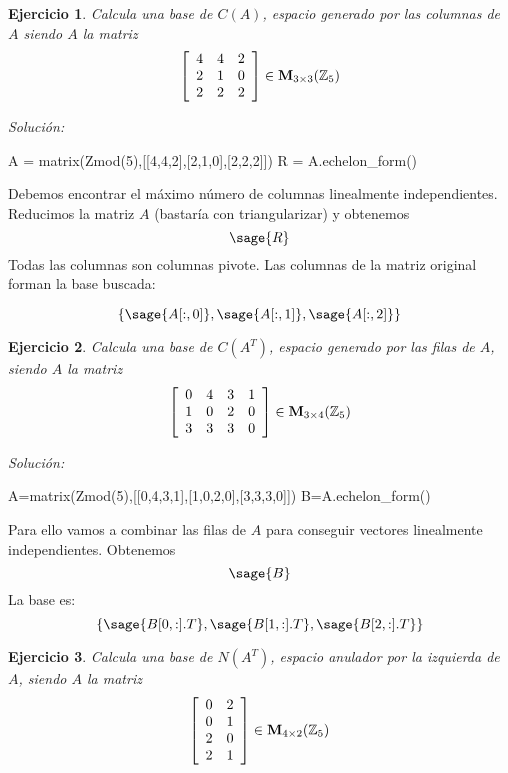 \documentclass{amsart}
\newtheorem{ejer}{Ejercicio}
\begin{document}

\begin{ejer} Calcula una base de $C(A)$, espacio generado por las columnas de $A$ siendo $A$ la matriz
\[ \left[\begin{array}{rrr}
4 & 4 & 2 \\
2 & 1 & 0 \\
2 & 2 & 2 
\end{array}\right] \in {\bf M}_{3 \times 3}({\mathbb Z}_{5})\]
\end{ejer}

{\it Soluci\'on:}
\begin{sageblock}
A = matrix(Zmod(5),[[4,4,2],[2,1,0],[2,2,2]])
R = A.echelon_form()
\end{sageblock}
Debemos encontrar el máximo número de columnas linealmente independientes. 
Reducimos la matriz $A$ (bastaría con triangularizar) y obtenemos
\[ \sage{R} \] Todas las columnas son columnas pivote. Las columnas de la 
matriz original forman la base buscada:

\[ \left\lbrace \sage{A[:,0]}, \sage{A[:,1]}, \sage{A[:,2]}  \right\rbrace \]




\begin{ejer} Calcula una base de $C(A^T)$, espacio generado por las filas de $A$, siendo $A$ la matriz
\[ \left[\begin{array}{rrrr}
0 & 4 & 3 & 1 \\
1 & 0 & 2 & 0 \\
3 & 3 & 3 & 0 
\end{array}\right] \in {\bf M}_{3 \times 4}({\mathbb Z}_{5})\]
\end{ejer}

{\it Soluci\'on:}
\begin{sageblock}
A=matrix(Zmod(5),[[0,4,3,1],[1,0,2,0],[3,3,3,0]])
B=A.echelon_form()
\end{sageblock}
Para ello vamos a combinar las filas de $A$ para conseguir vectores 
linealmente independientes. Obtenemos
\[ \sage{B} \] La base es:
\[ \left\lbrace \sage{B[0,:].T}, \sage{B[1,:].T}, \sage{B[2,:].T} \right\rbrace \] 


\begin{ejer} Calcula una base de $N(A^T)$, espacio anulador por la izquierda de 
$A$, siendo $A$ la matriz
\[ \left[\begin{array}{rr}
0 & 2 \\
0 & 1 \\
2 & 0 \\ 
2 & 1 
\end{array}\right] \in {\bf M}_{4 \times 2}({\mathbb Z}_{5})\]
\end{ejer}
\end{document}
